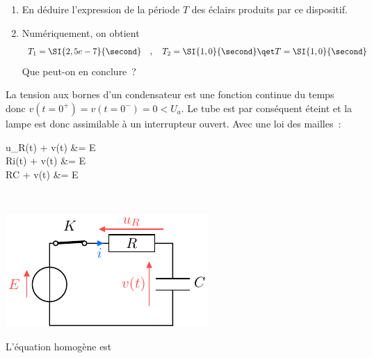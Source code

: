 \documentclass[a4paper, 10pt, garamond, oneside]{book}
\begin{document}
{\begin{enumerate}
		\item En déduire l'expression de la période $T$ des éclairs produits par ce
		      dispositif.
		\item Numériquement, on obtient
		      \[
			      T_1 = \SI{2,5e-7}{\second}
			      \quad , \quad
			      T_2 = \SI{1,0}{\second}
			      \qet
			      T = \SI{1,0}{\second}
		      \]
		      Que peut-on en conclure~?
	\end{enumerate}
}{
	\begin{enumerate}
		\noindent
		\begin{minipage}[t]{.55\linewidth}
			La tension aux bornes d'un condensateur est une fonction continue du
			temps donc $v(t=0^+)=v(t=0^-)=0<U_{a}$. Le tube est par conséquent
			éteint et la lampe est donc assimilable à un interrupteur ouvert.
			Avec une loi des mailles~:
			\begin{DispWithArrows*}[]
				u_R(t) + v(t) &= E
				\\\Lra
				Ri(t) + v(t) &= E
				\\\Lra
				RC  + v(t) &= E
				\\\Lra
			\end{DispWithArrows*}
		\end{minipage}
		\hfill
		\begin{minipage}[t]{.4\linewidth}
			~
			\vspace{-25pt}
			\begin{center}
				\includegraphics[width=\linewidth]{balise_q1}
			\end{center}
		\end{minipage}
		\begin{isd}[lefthand ratio=.4]
			L'équation homogène est

\end{isd}
\end{enumerate}}
\end{document}
